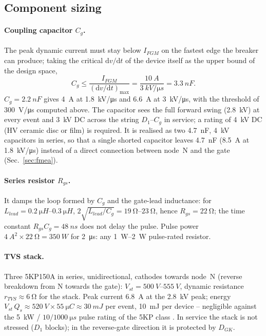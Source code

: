 \documentclass[11pt,a4paper]{article}
\begin{document}
\subsection{Component sizing}
\label{sec:components}

\paragraph{Coupling capacitor $C_g$.} The peak dynamic current must stay below $I_{FGM}$ on the
fastest edge the breaker can produce; taking the critical $\mathrm{d}v/\mathrm{d}t$ of the device
itself as the upper bound of the design space,
\begin{equation}
  C_g \le \frac{I_{FGM}}{(\mathrm{d}v/\mathrm{d}t)_{\max}} = \frac{\SI{10}{A}}{\SI{3}{kV/\micro s}}
  = \SI{3.3}{nF}.
\end{equation}
$C_g = \SI{2.2}{nF}$ gives \SI{4}{A} at \SI{1.8}{kV/\micro s} and \SI{6.6}{A} at
\SI{3}{kV/\micro s}, with the threshold of \SI{300}{V/\micro s} computed above. The capacitor
sees the full forward swing (\SI{2.8}{kV}) at every event and \SI{3}{kV} DC across the string
$D_1$--$C_g$ in service; a rating of \SI{4}{kV} DC (HV ceramic disc or film) is required. It is
realised as two \SI{4.7}{nF}, \SI{4}{kV} capacitors in series, so that a single shorted
capacitor leaves \SI{4.7}{nF} (\SI{8.5}{A} at \SI{1.8}{kV/\micro s}) instead of a direct
connection between node~N and the gate (Sec.~\ref{sec:fmea}).

\paragraph{Series resistor $R_{gs}$.} It damps the loop formed by $C_g$ and the gate-lead
inductance: for $L_{lead} = \SIrange{0.2}{0.3}{\micro H}$, $2\sqrt{L_{lead}/C_g} =
\SIrange{19}{23}{\ohm}$, hence $R_{gs} = \SI{22}{\ohm}$; the time constant $R_{gs}C_g =
\SI{48}{ns}$ does not delay the pulse. Pulse power $\SI{4}{A}^2 \times \SI{22}{\ohm} =
\SI{350}{W}$ for \SI{2}{\micro s}: any \SIrange{1}{2}{W} pulse-rated resistor.

\paragraph{TVS stack.} Three 5KP150A in series, unidirectional, cathodes towards node~N
(reverse breakdown from N towards the gate): $V_{st} = \SIrange{500}{555}{V}$, dynamic
resistance $r_{TVS} \approx \SI{6}{\ohm}$ for the stack. Peak current \SI{6.8}{A} at the
\SI{2.8}{kV} peak; energy $V_{st}\,Q_s \approx \SI{520}{V}\times\SI{55}{\micro C} \approx
\SI{30}{mJ}$ per event, \SI{10}{mJ} per device -- negligible against the \SI{5}{kW} /
$10/\SI{1000}{\micro s}$ pulse rating of the 5KP class \cite{tvs5kp}. In service the stack is not
stressed ($D_1$ blocks); in the reverse-gate direction it is protected by $D_{GK}$.
\end{document}
